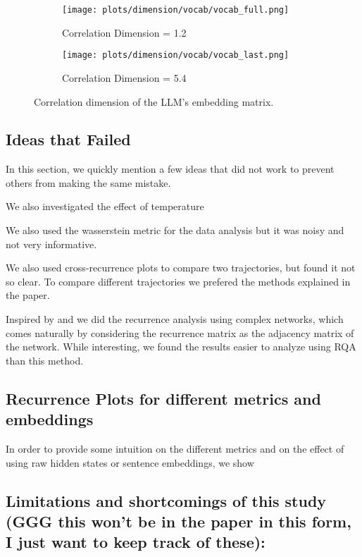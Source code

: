 \documentclass[a4paper,12pt]{article}
\begin{document}
\begin{figure}[H]
    \centering
    \begin{subfigure}[b]{0.48\linewidth}
        \centering
        \texttt{[image: plots/dimension/vocab/vocab\_full.png]}
        \caption{Correlation Dimension = 1.2}
    \end{subfigure}\hfill
    \begin{subfigure}[b]{0.48\linewidth}
        \centering
        \texttt{[image: plots/dimension/vocab/vocab\_last.png]}
        \caption{Correlation Dimension = 5.4}
    \end{subfigure}
    \caption{Correlation dimension of the LLM's embedding matrix.}
    \label{fig:embedding_dim}
\end{figure}


\subsection{Ideas that Failed}
\label{subsec:appendix_failed_ideas} %
In this section, we quickly mention a few ideas that did not work to prevent others from making the same mistake.

We also investigated the effect of temperature

We also used the wasserstein metric for the data analysis but it was noisy and not very informative.

We also used cross-recurrence plots to compare two trajectories, but found it not so clear. To compare different trajectories we prefered the methods explained in the paper.

Inspired by \cite{DONNER_2011} and \cite{Donner_2010} \cite{ZOU20191} we did the recurrence analysis using complex networks, which comes naturally by considering the recurrence matrix as the adjacency matrix of the network. While interesting, we found the results easier to analyze using RQA than this method. %

\subsection{Recurrence Plots for different metrics and embeddings} %

In order to provide some intuition on the different metrics and on the effect of using raw hidden states or sentence embeddings, we show 


\subsection{Limitations and shortcomings of this study (GGG this won't be in the paper in this form, I just want to keep track of these):}
\label{subsec:appendix_limitations}
\end{document}
